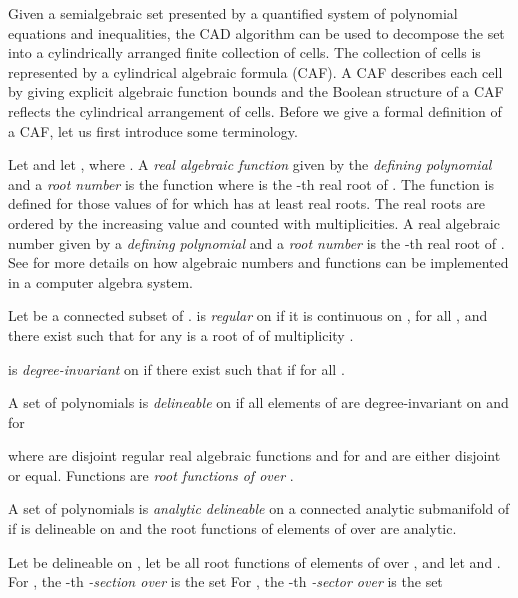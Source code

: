 \documentclass[english]{amsart}
\numberwithin{equation}{section}
\numberwithin{figure}{section}
\begin{document}
Given a semialgebraic set presented by a quantified system of polynomial
equations and inequalities, the CAD algorithm can be used to decompose
the set into a cylindrically arranged finite collection of cells.
The collection of cells is represented by a cylindrical algebraic
formula (CAF). A CAF describes each cell by giving explicit algebraic
function bounds and the Boolean structure of a CAF reflects the cylindrical
arrangement of cells. Before we give a formal definition of a CAF,
let us first introduce some terminology.

Let  and let , where .
A \emph{real algebraic function} given by the \emph{defining polynomial}
 and a \emph{root number}  is the function
where  is the -th real root of .
The function is defined for those values of  for which
 has at least  real roots. The real roots
are ordered by the increasing value and counted with multiplicities.
A real algebraic number  given by a \emph{defining
polynomial}  and a \emph{root number}  is
the -th real root of . See \cite{S2,S4} for more details
on how algebraic numbers and functions can be implemented in a computer
algebra system.

Let  be a connected subset of . 
is\emph{ regular} on \emph{} if it is continuous on , 
for all , and there exist\emph{ }
such that for any  
is a root of  of multiplicity . 

 is \emph{degree-invariant} on  if there exist\emph{ }
such that if 
for all . 

A set  of polynomials is \emph{delineable}
on  if all elements of  are degree-invariant on  and for

where  are disjoint regular real algebraic
functions and for   and 
are either disjoint or equal. Functions  are \emph{root
functions of  over }.

A set  of polynomials is \emph{analytic
delineable} on a connected analytic submanifold  of 
if  is delineable on  and the root functions of elements of
 over  are analytic.

Let  be delineable on , let  be all root
functions of elements of  over , and let 
and . For , the -th \emph{-section
over } is the set
For , the -th \emph{-sector over } is
the set
\end{document}
